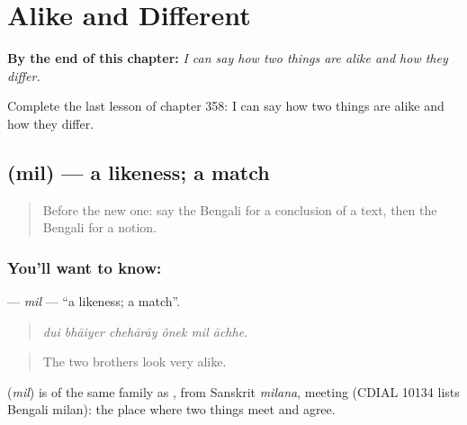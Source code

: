 
\chapter{Alike and Different}
\label{ch:bn-alike-and-different}

\begin{chapteropening}
\textbf{By the end of this chapter:} \emph{I can say how two things are alike and how they differ.}

Complete the last lesson of chapter 358: I can say how two things are alike and how they differ.
\end{chapteropening}

\section[\texorpdfstring{\bn{মিল} (mil)}{মিল (mil)}]{ (mil) — a likeness; a match}

\label{lesson:BN-C358-mil}



\begin{quote}
Before the new one: say the Bengali for a conclusion of a text, then the Bengali for a notion.
\end{quote}

\subsection*{You'll want to know: }
\textbf{} — \emph{mil} — \textquotedblleft{}a likeness; a match\textquotedblright{}.

\begin{quote}
     
\end{quote}

\begin{quote}
\emph{dui bhāiyer chehārāy ônek mil āchhe.}
\end{quote}

\begin{quote}
The two brothers look very alike.
\end{quote}

\begin{cousinweb}
\textbf{} (\emph{mil}) is of the same family as , from Sanskrit \emph{milana}, meeting (CDIAL 10134 lists Bengali milan): the place where two things meet and agree.
\end{cousinweb}

